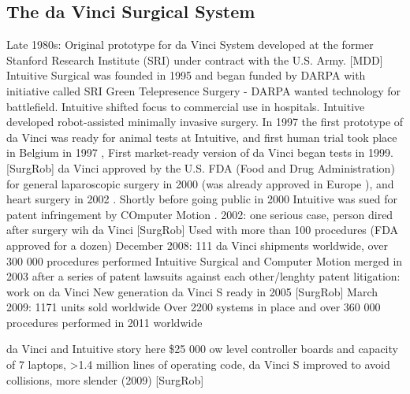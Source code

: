 \subsection{The da Vinci Surgical System}
Late 1980s: Original prototype for da Vinci System developed at the former Stanford Research Institute (SRI) under contract with the U.S. Army. [MDD]
Intuitive Surgical was founded in 1995 \citep{bib:intuitive_monopoly} and began funded by DARPA with initiative called SRI Green Telepresence Surgery - DARPA wanted technology for battlefield. Intuitive shifted focus to commercial use in hospitals. Intuitive developed robot-assisted minimally invasive surgery.
In 1997 the first prototype of da Vinci was ready for animal tests at Intuitive, and first human trial took place in Belgium in 1997 \citep{bib:intuitive_monopoly},
First market-ready version of da Vinci began tests in 1999. [SurgRob]
da Vinci approved by the U.S. FDA (Food and Drug Administration) for general laparoscopic surgery in 2000 (was already approved in Europe \citep{bib:intuitive_monopoly}), and heart surgery in 2002 \citep{bib:brown_univ}. Shortly before going public in 2000 Intuitive was sued for patent infringement by COmputer Motion \citep{bib:intuitive_monopoly}.
2002: one serious case, person dired after surgery wih da Vinci [SurgRob]
Used with more than 100 procedures (FDA approved for a dozen)
December 2008: 111 da Vinci shipments worldwide, over 300 000 procedures performed
Intuitive Surgical and Computer Motion merged in 2003 \citep{bib:telesurg_history} after a series of patent lawsuits against each other/lenghty patent litigation: work on da Vinci \citep{bib:intuitive_monopoly}
New generation da Vinci S ready in 2005 [SurgRob]
March 2009: 1171 units sold worldwide \citep{bib:intuitive_monopoly}
Over 2200 systems in place and over 360 000 procedures performed in 2011 worldwide \citep{bib:raven_ii}

da Vinci and Intuitive story here
\$25 000 ow level controller boards and capacity of 7 laptops, >1.4 million lines of operating code, da Vinci S improved to avoid collisions, more slender (2009) [SurgRob]

